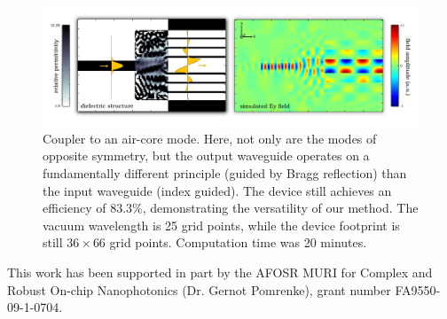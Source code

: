 \documentclass[letterpaper,10pt]{article}
\begin{document}
\begin{figure}[htbp]
    \centering
    \includegraphics[width=\textwidth]{fig/air-core}
    \caption{Coupler to an air-core mode.
        Here, not only are the modes of opposite symmetry,
        but the output waveguide operates on a fundamentally different
        principle (guided by Bragg reflection) than the input waveguide 
        (index guided).
        The device still achieves an efficiency of $83.3\%$, demonstrating the
        versatility of our method.
        The vacuum wavelength is 25 grid points, 
        while the device footprint is still $36 \times 66$ grid points.
        Computation time was 20 minutes.
        }
        \label{fig:aircore}
\end{figure}

This work has been supported in part by the 
    AFOSR MURI for Complex and Robust On-chip Nanophotonics 
    (Dr. Gernot Pomrenke), grant number FA9550-09-1-0704.
\end{document}
